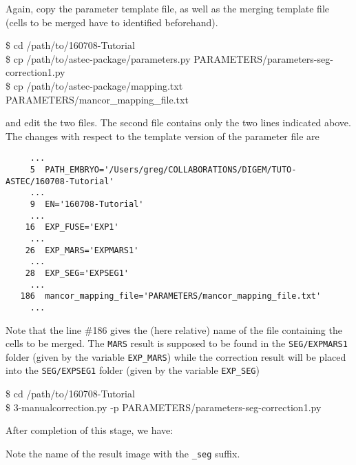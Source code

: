 Again, copy the parameter template file, as well as the merging template file (cells to be merged have to identified beforehand).

\begin{code}{0.8}
\$ cd /path/to/160708-Tutorial\\
\$ cp /path/to/astec-package/parameters.py PARAMETERS/parameters-seg-correction1.py \\
\$ cp /path/to/astec-package/mapping.txt PARAMETERS/mancor\_mapping\_file.txt
\end{code}

and edit the two files. The second file contains only the two lines indicated above.
The changes with respect to the template version of the parameter file are

\begin{verbatim}
     ...
     5	PATH_EMBRYO='/Users/greg/COLLABORATIONS/DIGEM/TUTO-ASTEC/160708-Tutorial'	
     ...
     9	EN='160708-Tutorial'			
     ... 
    16	EXP_FUSE='EXP1'	
     ...
    26	EXP_MARS='EXPMARS1'		
     ...
    28	EXP_SEG='EXPSEG1'
     ...
   186	mancor_mapping_file='PARAMETERS/mancor_mapping_file.txt' 
     ...
\end{verbatim}

Note that the line \#186 gives the (here relative) name of the file containing the cells to be merged. The \texttt{MARS} result is supposed to be found in the \texttt{SEG/EXPMARS1} folder (given by the variable \texttt{EXP\_MARS})  while the correction result will be placed into the \texttt{SEG/EXPSEG1} folder (given by the variable \texttt{EXP\_SEG})


\begin{code}{0.8}
\$ cd /path/to/160708-Tutorial\\
\$ 3-manualcorrection.py -p PARAMETERS/parameters-seg-correction1.py 
\end{code}

After completion of this stage, we have:

Note the name of the result image with the \texttt{\_seg} suffix.










